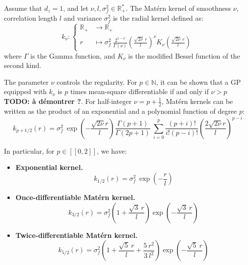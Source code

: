 \begin{definition}\label{th:Matérn}
	Assume that $d_z=1$, and let $\nu,l,\sigma_f^2\in\mathbb{R}_+^*$. The Matérn kernel of smoothness $\nu$, correlation length $l$ and variance $\sigma_f^2$ is the radial kernel defined as:
	\begin{equation}
		k_\nu:\left\{\begin{aligned}
		\mathbb{R}_+&\to\mathbb{R}_+\\
		r&\mapsto\sigma_f^2\:\frac{2^{1-\nu}}{\Gamma(\nu)}\left(\frac{\sqrt{2\nu}\:r}{l}\right)^\nu K_\nu\left(\frac{\sqrt{2\nu}\:r}{l}\right)
		\end{aligned}\right.
	\end{equation}
	where $\Gamma$ is the Gamma function, and $K_\nu$ is the modified Bessel function of the second kind.
\end{definition}

The parameter $\nu$ controls the regularity. For $p\in\mathbb{N}$, it can be shown that a GP equipped with $k_\nu$ is $p$ times mean-square differentiable if and only if $\nu>p$ \textbf{TODO: à démontrer ?}. For half-integer $\nu=p+\tfrac{1}{2}$, Matérn kernels can be written as the product of an exponential and a polynomial function of degree $p$:
\begin{equation}
	k_{p+1/2}(r)=\sigma_f^2\:\exp\left(-\frac{\sqrt{2\nu}r}{l}\right)\frac{\Gamma(p+1)}{\Gamma(2p+1)}\:\sum_{i=0}^p\frac{(p+i)!}{i!(p-i)!}\left(\frac{2\sqrt{2\nu}r}{l}\right)^{p-i}
\end{equation}

In particular, for $p\in[\![0,2]\!]$, we have:
\begin{itemize}
	\item\textbf{Exponential kernel.}
	\begin{equation}
		k_{1/2}(r)=\sigma_f^2\:\exp\left(-\frac{r}{l}\right)
	\end{equation}
	\item\textbf{Once-differentiable Matérn kernel.}
	\begin{equation}
		k_{3/2}(r)=\sigma_f^2\left(1+\frac{\sqrt{3}\:r}{l}\right)\exp\left(-\frac{\sqrt{3}\:r}{l}\right)
	\end{equation}
	\item\textbf{Twice-differentiable Matérn kernel.}
	\begin{equation}
		k_{5/2}(r)=\sigma_f^2\left(1+\frac{\sqrt{5}\:r}{l}+\frac{5\:r^2}{3\:l^2}\right)\exp\left(-\frac{\sqrt{5}\:r}{l}\right)
	\end{equation}
\end{itemize}

